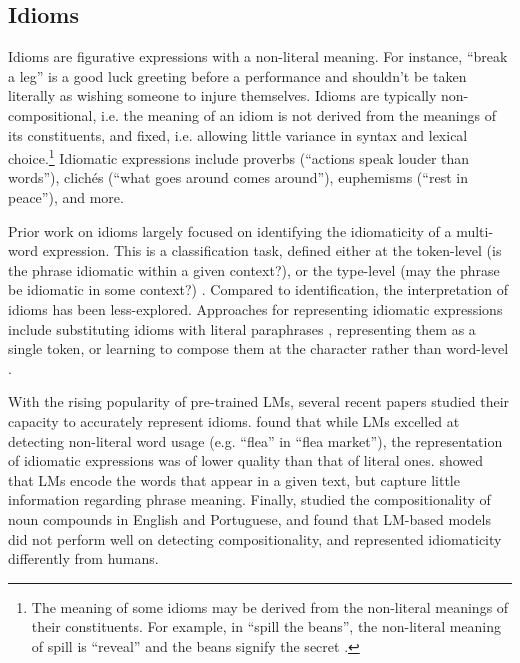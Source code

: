 \subsection{Idioms}
\label{sec:bg_idioms}

Idioms are figurative expressions with a non-literal meaning. For instance, ``break a leg'' is a good luck greeting before a performance and shouldn't be taken literally as wishing someone to injure themselves. Idioms are typically non-compositional, i.e. the meaning of an idiom is not derived from the meanings of its constituents, and fixed, i.e. allowing little variance in syntax and lexical choice.\footnote{The meaning of some idioms may be derived from the non-literal meanings of their constituents. For example, in ``spill the beans'', the non-literal meaning of spill is ``reveal'' and the beans signify the secret \cite{sag2002multiword}.} Idiomatic expressions include proverbs (``actions speak louder than words''), clich\'{e}s (``what goes around comes around''), euphemisms (``rest in peace''), and more. 

Prior work on idioms largely focused on identifying the idiomaticity of a multi-word expression. This is a classification task, defined either at the token-level (is the phrase idiomatic within a given context?), or the type-level (may the phrase be idiomatic in some context?)  \cite{fazly-etal-2009-unsupervised,li-sporleder-2009-classifier,verma-vuppuluri-2015-new,peng-feldman-2016-experiments,salton-etal-2016-idiom,AAAI1714939}. Compared to identification, the interpretation of idioms has been less-explored. Approaches for representing idiomatic expressions include substituting idioms with literal paraphrases \cite{liu-hwa-2016-phrasal,zhou-etal-2021-pie}, representing them as a single token, or learning to compose them at the character rather than word-level \cite{liu-etal-2017-idiom}. 


With the rising popularity of pre-trained LMs, several recent papers studied their capacity to accurately represent idioms.  found that while LMs excelled at detecting non-literal word usage (e.g. ``flea'' in ``flea market''), the representation of idiomatic expressions was of lower quality than that of literal ones.  showed that LMs encode the words that appear in a given text, but capture little information regarding phrase meaning. Finally,  studied the compositionality of noun compounds in English and Portuguese, and found that LM-based models did not perform well on detecting compositionality, and represented idiomaticity differently from humans. 


